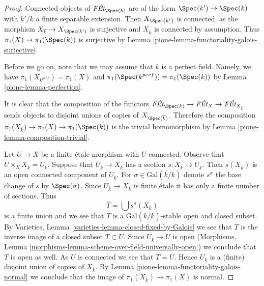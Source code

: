 \begin{proof}

Connected objects of $\textit{F\'Et}_{\Spec(k)}$ are of the form
$\Spec(k') \to \Spec(k)$ with $k'/k$ a finite separable extension.
Then $X_{\Spec{k'}}$ is connected, as the morphism
$X_{\overline{k}} \to X_{\Spec(k')}$ is surjective and
$X_{\overline{k}}$ is connected by assumption. Thus
$\pi_1(X) \to \pi_1(\Spec(k))$ is surjective by
Lemma \ref{pione-lemma-functoriality-galois-surjective}.

\medskip\noindent
Before we go on, note that we may assume that $k$ is a perfect field.
Namely, we have $\pi_1(X_{k^{perf}}) = \pi_1(X)$ and
$\pi_1(\Spec(k^{perf})) = \pi_1(\Spec(k))$ by Lemma \ref{pione-lemma-perfection}.

\medskip\noindent
It is clear that the composition of the functors
$\textit{F\'Et}_{\Spec(k)} \to \textit{F\'Et}_X \to
\textit{F\'Et}_{X_{\overline{k}}}$ sends objects to disjoint unions
of copies of $X_{\Spec(\overline{k})}$. Therefore the composition
$\pi_1(X_{\overline{k}}) \to \pi_1(X) \to \pi_1(\Spec(k))$
is the trivial homomorphism by Lemma \ref{pione-lemma-composition-trivial}.

\medskip\noindent
Let $U \to X$ be a finite \'etale morphism with $U$ connected.
Observe that $U \times_X X_{\overline{k}} = U_{\overline{k}}$.
Suppose that $U_{\overline{k}} \to X_{\overline{k}}$
has a section $s : X_{\overline{k}} \to U_{\overline{k}}$.
Then $s(X_{\overline{k}})$ is an open connected component of
$U_{\overline{k}}$. For $\sigma \in \text{Gal}(\overline{k}/k)$
denote $s^\sigma$ the base change of $s$ by $\Spec(\sigma)$.
Since $U_{\overline{k}} \to X_{\overline{k}}$ is finite \'etale
it has only a finite number of sections. Thus
$$
\overline{T} = \bigcup s^\sigma(X_{\overline{k}})
$$
is a finite union and we see that $\overline{T}$ is a
$\text{Gal}(\overline{k}/k)$-stable open and closed subset.
By Varieties, Lemma \ref{varieties-lemma-closed-fixed-by-Galois}
we see that $\overline{T}$ is the inverse image of a closed
subset $T \subset U$. Since $U_{\overline{k}} \to U$ is open
(Morphisms, Lemma \ref{morphisms-lemma-scheme-over-field-universally-open})
we conclude that $T$ is open as well. As $U$ is connected we
see that $T = U$. Hence $U_{\overline{k}}$ is a (finite) disjoint
union of copies of $X_{\overline{k}}$. By
Lemma \ref{pione-lemma-functoriality-galois-normal} we conclude that the image of
$\pi_1(X_{\overline{k}}) \to \pi_1(X)$ is normal.


\end{proof}
